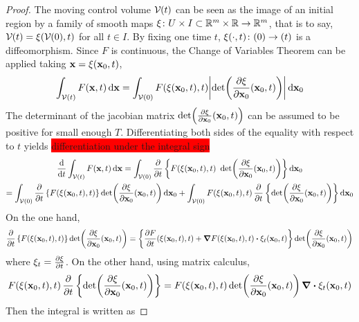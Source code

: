 \begin{proof}
	The moving control volume $\mathcal{V}_{}(t)$ can be seen as the image of an initial region by a family of smooth maps $\xi \colon U \times I \subset \mathbb{R}^m \times \mathbb{R} \rightarrow \mathbb{R}^m$, that is to say, $\mathcal{V}_{}(t) = \xi(\mathcal{V}_{}(0),t)$ for all $t \in I$. By fixing one time $t$, $\xi(\cdot, t) \colon \vb{}(0) \rightarrow \vb{}(t)$ is a diffeomorphism. Since $F$ is continuous, the Change of Variables Theorem can be applied taking $\vb{x} = \xi(\vb{x}_0,t)$,
	\begin{equation*}
		\int_{\mathcal{V}_{}(t)} F(\vb{x},t) \dd{\vb{x}} = 
		\int_{\mathcal{V}_{}(0)} F(\xi(\vb{x}_0,t), t) \abs{\det(\frac{\partial \xi}{\partial \vb{x}_0} (\vb{x}_0, t))} \dd{\vb{x}_0}
	\end{equation*}
	The determinant of the jacobian matrix $\det(\frac{\partial \xi}{\partial \vb{x}_0} (\vb{x}_0, t))$ can be assumed to be positive for small enough $T$. Differentiating both sides of the equality with respect to $t$ yields \colorbox{red}{differentiation under the integral sign}
	\begin{multline*}
		\frac{\dd}{\dd{t}} \int_{\mathcal{V}_{}(t)} F(\vb{x}, t) \dd{\vb{x}} = 
		\int_{\mathcal{V}_{}(0)} \pdv{t} 
		\left\{
		F(\xi(\vb{x}_0,t), t) \ \det(\frac{\partial \xi}{\partial \vb{x}_0} (\vb{x}_0, t))
		\right\}
		\dd{\vb{x}_0} 
		\\
		= 
		\int_{\mathcal{V}_{}(0)} 
		\pdv{t} \left\{ F(\xi(\vb{x}_0,t), t) \right\} \det(\frac{\partial \xi}{\partial \vb{x}_0} (\vb{x}_0, t)) \dd{\vb{x}_0} + 
		\int_{\mathcal{V}_{}(0)} F(\xi(\vb{x}_0,t), t) \, \pdv{t} \left\{ \det(\frac{\partial \xi}{\partial \vb{x}_0} (\vb{x}_0, t)) \right\} \dd{\vb{x}_0}
	\end{multline*}
	On the one hand,
	\begin{equation*}
		\pdv{t} \left\{ F(\xi(\vb{x}_0,t), t) \right\} \det(\frac{\partial \xi}{\partial \vb{x}_0} (\vb{x}_0, t)) = 
		\left\{ 
		\frac{\partial F}{\partial t} (\xi(\vb{x}_0, t), t) + 
		\grad{F(\xi(\vb{x}_0, t), t)} \vdot \xi_t (\vb{x}_0, t)
		\right\}
		\det(\frac{\partial \xi}{\partial \vb{x}_0} (\vb{x}_0, t))
	\end{equation*}
	where $\xi_t = \pdv{\xi}{t}$. On the other hand, using matrix calculus,
	\begin{equation*}
		F(\xi(\vb{x}_0,t), t) \, \pdv{t} \left\{ \det(\frac{\partial \xi}{\partial \vb{x}_0} (\vb{x}_0, t)) \right\} = 
		F(\xi(\vb{x}_0,t), t) \det(\frac{\partial \xi}{\partial \vb{x}_0} (\vb{x}_0, t)) \, \div{\xi_t(\vb{x}_0,t)}
	\end{equation*}
	Then the integral is written as

\end{proof}
